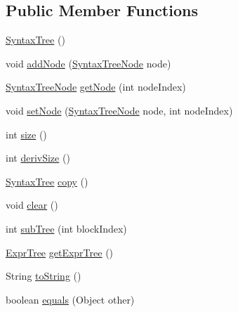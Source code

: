 \subsection*{Public Member Functions}
\begin{DoxyCompactItemize}
\item 
\hyperlink{classnet_1_1sf_1_1jclec_1_1syntaxtree_1_1_syntax_tree_a899c18e242325456ddab61a9f46f2c31}{Syntax\-Tree} ()
\item 
void \hyperlink{classnet_1_1sf_1_1jclec_1_1syntaxtree_1_1_syntax_tree_a39b696b1b4288bf78b0fef8201c715cd}{add\-Node} (\hyperlink{classnet_1_1sf_1_1jclec_1_1syntaxtree_1_1_syntax_tree_node}{Syntax\-Tree\-Node} node)
\item 
\hyperlink{classnet_1_1sf_1_1jclec_1_1syntaxtree_1_1_syntax_tree_node}{Syntax\-Tree\-Node} \hyperlink{classnet_1_1sf_1_1jclec_1_1syntaxtree_1_1_syntax_tree_a7746c243d1d5dde1a0bab11a1b558e3e}{get\-Node} (int node\-Index)
\item 
void \hyperlink{classnet_1_1sf_1_1jclec_1_1syntaxtree_1_1_syntax_tree_ae4d5e29bfa8f8e0928e8e6ae2dc8f28f}{set\-Node} (\hyperlink{classnet_1_1sf_1_1jclec_1_1syntaxtree_1_1_syntax_tree_node}{Syntax\-Tree\-Node} node, int node\-Index)
\item 
int \hyperlink{classnet_1_1sf_1_1jclec_1_1syntaxtree_1_1_syntax_tree_aeb48f9ae4696db83f6f987fd72b62377}{size} ()
\item 
int \hyperlink{classnet_1_1sf_1_1jclec_1_1syntaxtree_1_1_syntax_tree_a41c36a1975b721c9fd8bac6ae36fbb08}{deriv\-Size} ()
\item 
\hyperlink{classnet_1_1sf_1_1jclec_1_1syntaxtree_1_1_syntax_tree}{Syntax\-Tree} \hyperlink{classnet_1_1sf_1_1jclec_1_1syntaxtree_1_1_syntax_tree_a1980bd2c9a1c75967b6feb238001510d}{copy} ()
\item 
void \hyperlink{classnet_1_1sf_1_1jclec_1_1syntaxtree_1_1_syntax_tree_ab041275c30b07b99d2b6ee9a0e63ce55}{clear} ()
\item 
int \hyperlink{classnet_1_1sf_1_1jclec_1_1syntaxtree_1_1_syntax_tree_a9870efca9c1a9e31ce3525458faa7ac9}{sub\-Tree} (int block\-Index)
\item 
\hyperlink{classnet_1_1sf_1_1jclec_1_1exprtree_1_1_expr_tree}{Expr\-Tree} \hyperlink{classnet_1_1sf_1_1jclec_1_1syntaxtree_1_1_syntax_tree_aef7e9294d726ba966dcabbd91dd4ad75}{get\-Expr\-Tree} ()
\item 
String \hyperlink{classnet_1_1sf_1_1jclec_1_1syntaxtree_1_1_syntax_tree_a122023d3bb002cb87fef401538000657}{to\-String} ()
\item 
boolean \hyperlink{classnet_1_1sf_1_1jclec_1_1syntaxtree_1_1_syntax_tree_a0a3dab52aedbe1daaf156ebe9ad937ad}{equals} (Object other)
\end{DoxyCompactItemize}



